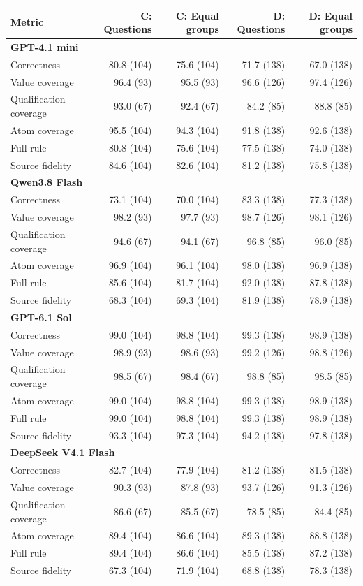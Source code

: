 \begin{tabular}{lrrrr}
\toprule
Metric & C: Questions & C: Equal groups & D: Questions & D: Equal groups \\
\midrule
\multicolumn{5}{l}{\textbf{GPT-4.1 mini}} \\
Correctness & 80.8 (104) & 75.6 (104) & 71.7 (138) & 67.0 (138) \\
Value coverage & 96.4 (93) & 95.5 (93) & 96.6 (126) & 97.4 (126) \\
Qualification coverage & 93.0 (67) & 92.4 (67) & 84.2 (85) & 88.8 (85) \\
Atom coverage & 95.5 (104) & 94.3 (104) & 91.8 (138) & 92.6 (138) \\
Full rule & 80.8 (104) & 75.6 (104) & 77.5 (138) & 74.0 (138) \\
Source fidelity & 84.6 (104) & 82.6 (104) & 81.2 (138) & 75.8 (138) \\
\multicolumn{5}{l}{\textbf{Qwen3.8 Flash}} \\
Correctness & 73.1 (104) & 70.0 (104) & 83.3 (138) & 77.3 (138) \\
Value coverage & 98.2 (93) & 97.7 (93) & 98.7 (126) & 98.1 (126) \\
Qualification coverage & 94.6 (67) & 94.1 (67) & 96.8 (85) & 96.0 (85) \\
Atom coverage & 96.9 (104) & 96.1 (104) & 98.0 (138) & 96.9 (138) \\
Full rule & 85.6 (104) & 81.7 (104) & 92.0 (138) & 87.8 (138) \\
Source fidelity & 68.3 (104) & 69.3 (104) & 81.9 (138) & 78.9 (138) \\
\multicolumn{5}{l}{\textbf{GPT-6.1 Sol}} \\
Correctness & 99.0 (104) & 98.8 (104) & 99.3 (138) & 98.9 (138) \\
Value coverage & 98.9 (93) & 98.6 (93) & 99.2 (126) & 98.8 (126) \\
Qualification coverage & 98.5 (67) & 98.4 (67) & 98.8 (85) & 98.5 (85) \\
Atom coverage & 99.0 (104) & 98.8 (104) & 99.3 (138) & 98.9 (138) \\
Full rule & 99.0 (104) & 98.8 (104) & 99.3 (138) & 98.9 (138) \\
Source fidelity & 93.3 (104) & 97.3 (104) & 94.2 (138) & 97.8 (138) \\
\multicolumn{5}{l}{\textbf{DeepSeek V4.1 Flash}} \\
Correctness & 82.7 (104) & 77.9 (104) & 81.2 (138) & 81.5 (138) \\
Value coverage & 90.3 (93) & 87.8 (93) & 93.7 (126) & 91.3 (126) \\
Qualification coverage & 86.6 (67) & 85.5 (67) & 78.5 (85) & 84.4 (85) \\
Atom coverage & 89.4 (104) & 86.6 (104) & 89.3 (138) & 88.8 (138) \\
Full rule & 89.4 (104) & 86.6 (104) & 85.5 (138) & 87.2 (138) \\
Source fidelity & 67.3 (104) & 71.9 (104) & 68.8 (138) & 78.3 (138) \\
\bottomrule
\end{tabular}
